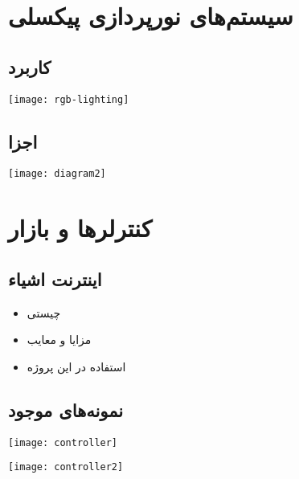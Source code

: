\documentclass{beamer}
\title{\titlefa}
\author{\authorfa}
\institute[\instfa]{%
	استاد راهنما:\\\textbf\supervisorfa\par%
	\vspace{2em}\departfa\\\instfa%
}
\date{\datefa}
\begin{document}
\begin{frame}
  \titlepage{}
\end{frame}

\section{سیستم‌های نورپردازی پیکسلی}
\subsection{کاربرد}

\begin{frame}{\subsecname}{\secname}
  \texttt{[image: rgb-lighting]}
\end{frame}

\subsection{اجزا}

\begin{frame}{\subsecname}{\secname}
  \texttt{[image: diagram2]}
\end{frame}

\section{کنترلرها و بازار}
\subsection{اینترنت اشیاء}

\begin{frame}{\subsecname}{\secname}
  \begin{itemize}
    \item چیستی
    \item مزایا و معایب
    \item استفاده در این پروژه
  \end{itemize}
\end{frame}

\subsection{نمونه‌های موجود}

\begin{frame}{\subsecname}{\secname}
  \texttt{[image: controller]}
\end{frame}

\begin{frame}{\subsecname}{\secname}
  \texttt{[image: controller2]}
\end{frame}
\end{document}

